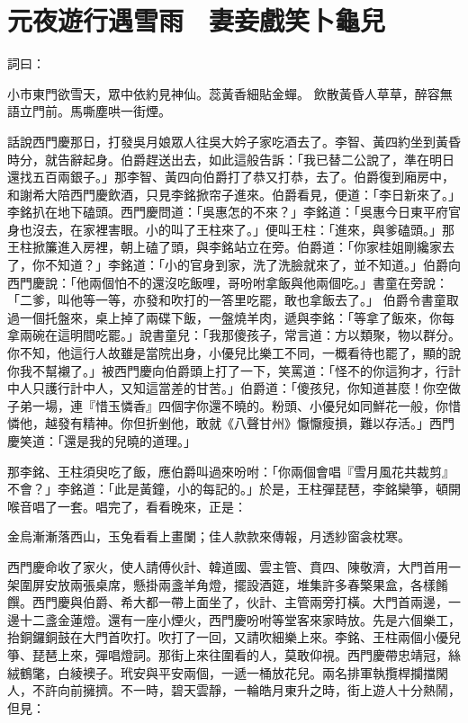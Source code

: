 %

\chapter{元夜遊行遇雪雨　妻妾戲笑卜龜兒}

詞曰：

小市東門欲雪天，眾中依約見神仙。蕊黃香細貼金蟬。
飲散黃昏人草草，醉容無語立門前。馬嘶塵哄一街煙。

話說西門慶那日，打發吳月娘眾人往吳大妗子家吃酒去了。李智、黃四約坐到黃昏時分，就告辭起身。伯爵趕送出去，如此這般告訴：「我已替二公說了，準在明日還找五百兩銀子。」那李智、黃四向伯爵打了恭又打恭，去了。伯爵復到廂房中，和謝希大陪西門慶飲酒，只見李銘掀帘子進來。伯爵看見，便道：「李日新來了。」李銘扒在地下磕頭。西門慶問道：「吳惠怎的不來？」李銘道：「吳惠今日東平府官身也沒去，在家裡害眼。小的叫了王柱來了。」便叫王柱：「進來，與爹磕頭。」那王柱掀簾進入房裡，朝上磕了頭，與李銘站立在旁。伯爵道：「你家桂姐剛纔家去了，你不知道？」李銘道：「小的官身到家，洗了洗臉就來了，並不知道。」伯爵向西門慶說：「他兩個怕不的還沒吃飯哩，哥吩咐拿飯與他兩個吃。」書童在旁說：「二爹，叫他等一等，亦發和吹打的一答里吃罷，敢也拿飯去了。」 伯爵令書童取過一個托盤來，桌上掉了兩碟下飯，一盤燒羊肉，遞與李銘：「等拿了飯來，你每拿兩碗在這明間吃罷。」說書童兒：「我那傻孩子，常言道：方以類聚，物以群分。你不知，他這行人故雖是當院出身，小優兒比樂工不同，一概看待也罷了，顯的說你我不幫襯了。」被西門慶向伯爵頭上打了一下，笑罵道：「怪不的你這狗才，行計中人只護行計中人，又知這當差的甘苦。」伯爵道：「傻孩兒，你知道甚麼！你空做子弟一場，連『惜玉憐香』四個字你還不曉的。粉頭、小優兒如同鮮花一般，你惜憐他，越發有精神。你但折剉他，敢就《八聲甘州》懨懨瘦損，難以存活。」西門慶笑道：「還是我的兒曉的道理。」

那李銘、王柱須臾吃了飯，應伯爵叫過來吩咐：「你兩個會唱『雪月風花共裁剪』不會？」李銘道：「此是黃鐘，小的每記的。」於是，王柱彈琵琶，李銘欒箏，頓開喉音唱了一套。唱完了，看看晚來，正是：

金烏漸漸落西山，玉兔看看上畫闌；佳人款款來傳報，月透紗窗衾枕寒。

西門慶命收了家火，使人請傅伙計、韓道國、雲主管、賁四、陳敬濟，大門首用一架圍屏安放兩張桌席，懸掛兩盞羊角燈，擺設酒筵，堆集許多春檠果盒，各樣餚饌。西門慶與伯爵、希大都一帶上面坐了，伙計、主管兩旁打橫。大門首兩邊，一邊十二盞金蓮燈。還有一座小煙火，西門慶吩咐等堂客來家時放。先是六個樂工，抬銅鑼銅鼓在大門首吹打。吹打了一回，又請吹細樂上來。李銘、王柱兩個小優兒箏、琵琶上來，彈唱燈詞。那街上來往圍看的人，莫敢仰視。西門慶帶忠靖冠，絲絨鶴氅，白綾襖子。玳安與平安兩個，一遞一桶放花兒。兩名排軍執攬桿攔擋閑人，不許向前擁擠。不一時，碧天雲靜，一輪皓月東升之時，街上遊人十分熱鬧，但見：

